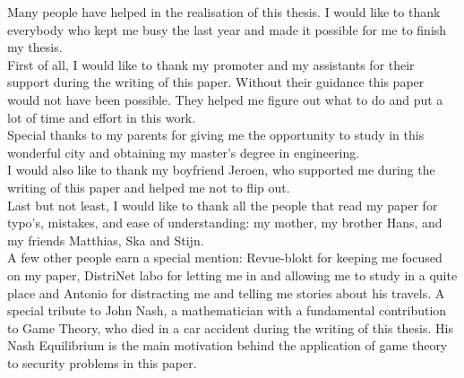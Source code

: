 \documentclass[master=cws, masteroption=vs,english]{kulemt}
\begin{document}
\begin{preface}


 Many people have helped in the realisation of this thesis. 
  I would like to thank everybody who kept me busy the last year and made it possible for me to finish my thesis.\\
  
  First of all, I would like to thank my promoter and my assistants for their support during the writing of this paper. Without their guidance this paper would not have been possible. They helped me figure out what to do and put a lot of time and effort in this work.\\
  Special thanks to my parents for giving me the opportunity to study in this wonderful city and obtaining my master's degree in engineering.\\
   I would also like to thank my boyfriend Jeroen, who supported me during the writing of this paper and helped me not to flip out.  \\   
   Last but not least, I would like to thank all the people that read my paper for typo's, mistakes, and ease of understanding: my mother, my brother Hans, and my friends Matthias, Ska and Stijn. \\

   
      A few other people earn a special mention: Revue-blokt for keeping me focused on my paper, DistriNet labo for letting me in and allowing me to study in a quite place and Antonio for distracting me and telling me stories about his travels.
   A special tribute to John Nash, a mathematician with a fundamental contribution to Game Theory, who died in a car accident during the writing of this thesis. His Nash Equilibrium is the main motivation behind the application of game theory to security problems in this paper. \\
 

\end{preface}

\tableofcontents*
\end{document}

